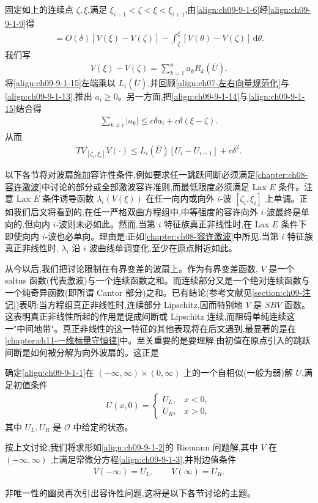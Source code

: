 \documentclass[../../main.tex]{subfiles}
\begin{document}
固定如上的连续点 $\zeta,\xi$,满足 $\xi_{i-1}<\zeta<\xi<\xi_{i+1}$,由\eqref{align:ch09-9-1-6}经\eqref{align:ch09-9-1-9}得
\begin{align}
[\mathrm{D}F(\bar{U})-\lambda_{i}(\bar{U})I][V(\xi)-V(\zeta)]
=O(\delta)[V(\xi)-V(\zeta)]-\int_{\zeta}^{\xi}[V(\theta)-V(\zeta)]\,\mathrm{d}\theta.
\label{align:ch09-9-1-14}
\end{align}
我们写
\begin{align}
V(\xi)-V(\zeta)=\sum_{k=1}^{n}a_{k}R_{k}(\bar{U}).
\label{align:ch09-9-1-15}
\end{align}
将\eqref{align:ch09-9-1-15}左端乘以 $L_{i}(\bar{U})$,并回顾\eqref{align:ch07-左右向量规范化}与\eqref{align:ch09-9-1-13},推出 $a_{i}\geqslant0$。另一方面,把\eqref{align:ch09-9-1-14}与\eqref{align:ch09-9-1-15}结合得
\begin{align}
\sum_{k\neq i}|a_{k}|\leqslant c\delta a_{i}+c\delta(\xi-\zeta).
\label{align:ch09-9-1-16}
\end{align}
从而
\begin{align}
TV_{[\zeta_{i},\xi_{i}]}V(\cdot)\leqslant L_{i}(\bar{U})[U_{i}-U_{i-1}]+c\delta^{2}.
\label{align:ch09-9-1-17}
\end{align}

以下各节将对波扇施加容许性条件,例如要求任一跳跃间断必须满足\cref{chapter:ch08-容许激波}中讨论的部分或全部激波容许准则,而最低限度必须满足 Lax $E$ 条件。注意 Lax $E$ 条件诱导函数 $\lambda_{i}(V(\xi))$ 在任一向内或向外 $i$-波 $[\zeta_{i},\xi_{i}]$ 上单调。正如我们后文将看到的,在任一严格双曲方程组中,中等强度的容许向外 $i$-波最终是单向的,但向内 $i$-波则未必如此。然而,当第 $i$ 特征族真正非线性时,在 Lax $E$ 条件下即使向内 $i$-波也必单向。理由是:正如\cref{chapter:ch08-容许激波}中所见,当第 $i$ 特征族真正非线性时, $\lambda_{i}$ 沿 $i$ 波曲线单调变化,至少在原点附近如此。

从今以后,我们把讨论限制在有界变差的波扇上。作为有界变差函数, $V$ 是一个 saltus 函数(代表激波)与一个连续函数之和。而连续部分又是一个绝对连续函数与一个纯奇异函数(即所谓 Cantor 部分)之和。已有结论(参考文献见\cref{section:ch09-注记})表明:当方程组真正非线性时,连续部分 Lipschitz,因而特别地 $V$ 是 $SBV$ 函数。这表明真正非线性所起的作用是促成间断或 Lipschitz 连续,而阻碍单纯连续这一"中间地带"。真正非线性的这一特征的其他表现将在后文遇到,最显著的是在\cref{chapter:ch11-一维标量守恒律}中。至关重要的是要理解:由初值在原点引入的跳跃间断是如何被分解为向外波扇的。这正是

\begin{definition}[Riemann 问题]\label{definition:ch09-riemann问题}
确定\eqref{align:ch09-9-1-1}在 $(-\infty,\infty)\times(0,\infty)$ 上的一个自相似(一般为弱)解 $U$,满足初值条件
\begin{align}
U(x,0)=
\begin{cases}
U_{L},&x<0,\\
U_{R},&x>0,
\end{cases}
\label{align:ch09-9-1-18}
\end{align}
其中 $U_{L},U_{R}$ 是 $\mathscr{O}$ 中给定的状态。
\end{definition}

按上文讨论,我们将求形如\eqref{align:ch09-9-1-2}的 Riemann 问题解,其中 $V$ 在 $(-\infty,\infty)$ 上满足常微分方程\eqref{align:ch09-9-1-3},并附边值条件
\begin{align}
V(-\infty)=U_{L},\qquad V(\infty)=U_{R}.
\label{align:ch09-9-1-19}
\end{align}

非唯一性的幽灵再次引出容许性问题,这将是以下各节讨论的主题。
\end{document}
